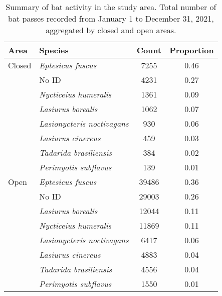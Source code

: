 \begin{table}[ht]
\centering
\caption{Summary of bat activity in the study area.
             Total number of bat passes recorded from January 1 to December 31, 2021,
             aggregated by closed and open areas.} 
\label{tab:bat-tbl}
\begingroup\small
\begin{tabular}{llcc}
  \hline
Area & Species & Count & Proportion \\ 
  \hline
Closed & \textit{Eptesicus fuscus} & 7255 & 0.46 \\ 
   & No ID & 4231 & 0.27 \\ 
   & \textit{Nycticeius humeralis} & 1361 & 0.09 \\ 
   & \textit{Lasiurus borealis} & 1062 & 0.07 \\ 
   & \textit{Lasionycteris noctivagans} & 930 & 0.06 \\ 
   & \textit{Lasiurus cinereus} & 459 & 0.03 \\ 
   & \textit{Tadarida brasiliensis} & 384 & 0.02 \\ 
   & \textit{Perimyotis subflavus} & 139 & 0.01 \\ 
  Open & \textit{Eptesicus fuscus} & 39486 & 0.36 \\ 
   & No ID & 29003 & 0.26 \\ 
   & \textit{Lasiurus borealis} & 12044 & 0.11 \\ 
   & \textit{Nycticeius humeralis} & 11869 & 0.11 \\ 
   & \textit{Lasionycteris noctivagans} & 6417 & 0.06 \\ 
   & \textit{Lasiurus cinereus} & 4883 & 0.04 \\ 
   & \textit{Tadarida brasiliensis} & 4556 & 0.04 \\ 
   & \textit{Perimyotis subflavus} & 1550 & 0.01 \\ 
   \hline
\end{tabular}
\endgroup
\end{table}
